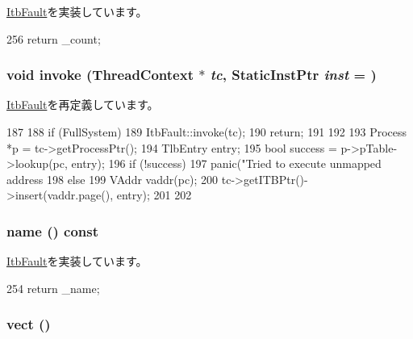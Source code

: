\hyperlink{classAlphaISA_1_1ItbFault_a4b643982263b390349238a6711216763}{ItbFault}を実装しています。


\begin{DoxyCode}
256 {return _count;}
\end{DoxyCode}
\hypertarget{classAlphaISA_1_1ItbPageFault_a2bd783b42262278d41157d428e1f8d6f}{
\subsubsection[{invoke}]{\setlength{\rightskip}{0pt plus 5cm}void invoke ({\bf ThreadContext} $\ast$ {\em tc}, \/  {\bf StaticInstPtr} {\em inst} = {})}}
\label{classAlphaISA_1_1ItbPageFault_a2bd783b42262278d41157d428e1f8d6f}


\hyperlink{classAlphaISA_1_1ItbFault_a2bd783b42262278d41157d428e1f8d6f}{ItbFault}を再定義しています。


\begin{DoxyCode}
187 {
188     if (FullSystem) {
189         ItbFault::invoke(tc);
190         return;
191     }
192 
193     Process *p = tc->getProcessPtr();
194     TlbEntry entry;
195     bool success = p->pTable->lookup(pc, entry);
196     if (!success) {
197         panic("Tried to execute unmapped address %
198     } else {
199         VAddr vaddr(pc);
200         tc->getITBPtr()->insert(vaddr.page(), entry);
201     }
202 }
\end{DoxyCode}
\hypertarget{classAlphaISA_1_1ItbPageFault_a73adb23259baf912a81683a9790a303f}{
\subsubsection[{name}]{ name () const}}
\label{classAlphaISA_1_1ItbPageFault_a73adb23259baf912a81683a9790a303f}


\hyperlink{classAlphaISA_1_1ItbFault_a09ac100f5ad40cf1726c4e60925c2522}{ItbFault}を実装しています。


\begin{DoxyCode}
254 {return _name;}
\end{DoxyCode}
\hypertarget{classAlphaISA_1_1ItbPageFault_ae15c5d7ab0162821b93d668d0b225198}{
\subsubsection[{vect}]{ vect ()}}
\label{classAlphaISA_1_1ItbPageFault_ae15c5d7ab0162821b93d668d0b225198}


